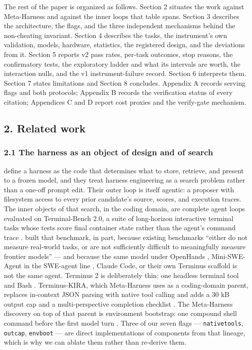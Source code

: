 \documentclass[
  10pt,
  a4paper,
]{article}
\let\oldtexttt\texttt
\renewcommand{\texttt}[1]{{\small\oldtexttt{#1}}}
\begin{document}
The rest of the paper is organized as follows. Section 2 situates the
work against Meta-Harness and against the inner loops that table spans.
Section 3 describes the architecture, the flags, and the three
independent mechanisms behind the non-cheating invariant. Section 4
describes the tasks, the instrument's own validation, models, hardware,
statistics, the registered design, and the deviations from it. Section 5
reports v2 pass rates, per-task outcomes, stop reasons, the confirmatory
tests, the exploratory ladder and what its intervals are worth, the
interaction nulls, and the v1 instrument-failure record. Section 6
interprets them. Section 7 states limitations and Section 8 concludes.
Appendix A records serving flags and both protocols; Appendix B records
the verification status of every citation; Appendices C and D report
cost proxies and the verify-gate mechanism.

\subsection{2. Related work}\label{related-work}

\subsubsection{2.1 The harness as an object of design and of
search}\label{the-harness-as-an-object-of-design-and-of-search}

\citet{lee2026metaharness} define a harness as the code that determines
what to store, retrieve, and present to a frozen model, and they treat
harness engineering as a search problem rather than a one-off prompt
edit. Their outer loop is itself agentic: a proposer with filesystem
access to every prior candidate's source, scores, and execution traces.
The inner objects of that search, in the coding domain, are complete
agent loops evaluated on Terminal-Bench 2.0, a suite of long-horizon
interactive terminal tasks whose tests score final container state
rather than the agent's command trace \citep{merrill2026terminalbench}.
\citet{merrill2026terminalbench} built that benchmark, in part, because
existing benchmarks ``either do not measure real-world tasks, or are not
sufficiently difficult to meaningfully measure frontier models'' --- and
because the same model under OpenHands \citep{wang2024openhands},
Mini-SWE-Agent in the SWE-agent line \citep{yang2024sweagent}, Claude
Code, or their own Terminus scaffold is not the same agent. Terminus 2
is deliberately thin: one headless terminal tool and Bash
\citep{merrill2026terminalbench}. Terminus-KIRA, which Meta-Harness uses
as a coding-domain parent, replaces in-context JSON parsing with native
tool calling and adds a 30 kB output cap and a multi-perspective
completion checklist \citep{lee2026metaharness, krafton2026kira}. The
Meta-Harness discovery on top of that parent is environment bootstrap:
one compound shell command before the first model turn
\citep[§B.3]{lee2026metaharness}. Three of our seven flags ---
\texttt{nativetools}, \texttt{outcap}, \texttt{envboot} --- are direct
implementations of components from that lineage, which is why we can
ablate them rather than re-derive them.
\end{document}
